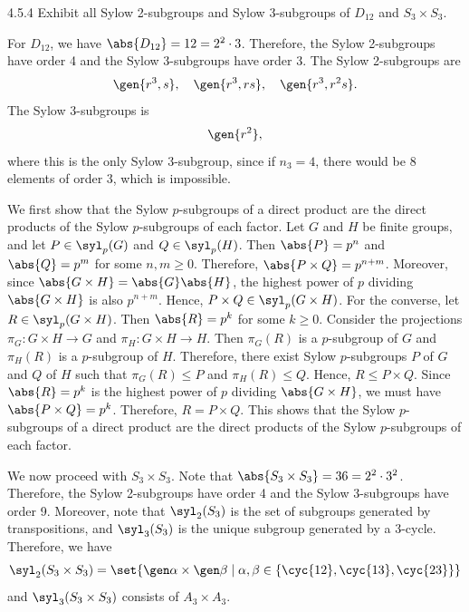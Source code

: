\begin{exercise}{4.5.4}
	Exhibit all Sylow 2-subgroups and Sylow 3-subgroups of $D_{12}$ and $S_3 \times S_3$.
\end{exercise}

\begin{sol}
	For $D_{12}$, we have $\abs{D_{12}} = 12 = 2^2 \cdot 3$.
	Therefore, the Sylow 2-subgroups have order 4 and the Sylow 3-subgroups have order 3.
	The Sylow 2-subgroups are
	\[
		\gen{r^3, s}, \quad \gen{r^3, rs}, \quad \gen{r^3, r^2s}.
	\]
	The Sylow 3-subgroups is
	\[
		\gen{r^2},
	\]
	where this is the only Sylow 3-subgroup, since if $n_3 = 4$, there would be $8$ elements of order $3$, which is impossible.

	We first show that the Sylow $p$-subgroups of a direct product are the direct products of the Sylow $p$-subgroups of each factor.
	Let $G$ and $H$ be finite groups, and let $P \in \syl_p(G)$ and $Q \in \syl_p(H)$.
	Then $\abs{P} = p^n$ and $\abs{Q} = p^m$ for some $n, m \geq 0$.
	Therefore, $\abs{P \times Q} = p^{n + m}$.
	Moreover, since $\abs{G \times H} = \abs{G}\abs{H}$, the highest power of $p$ dividing $\abs{G \times H}$ is also $p^{n + m}$.
	Hence, $P \times Q \in \syl_p(G \times H)$.
	For the converse, let $R \in \syl_p(G \times H)$.
	Then $\abs{R} = p^k$ for some $k \geq 0$.
	Consider the projections $\pi_G \colon G \times H \to G$ and $\pi_H \colon G \times H \to H$.
	Then $\pi_G(R)$ is a $p$-subgroup of $G$ and $\pi_H(R)$ is a $p$-subgroup of $H$.
	Therefore, there exist Sylow $p$-subgroups $P$ of $G$ and $Q$ of $H$ such that $\pi_G(R) \leq P$ and $\pi_H(R) \leq Q$.
	Hence, $R \leq P \times Q$.
	Since $\abs{R} = p^k$ is the highest power of $p$ dividing $\abs{G \times H}$, we must have $\abs{P \times Q} = p^k$.
	Therefore, $R = P \times Q$.
	This shows that the Sylow $p$-subgroups of a direct product are the direct products of the Sylow $p$-subgroups of each factor.

	We now proceed with $S_3 \times S_3$.
	Note that $\abs{S_3 \times S_3} = 36 = 2^2 \cdot 3^2$.
	Therefore, the Sylow 2-subgroups have order 4 and the Sylow 3-subgroups have order 9.
	Moreover, note that $\syl_2(S_3)$ is the set of subgroups generated by transpositions, and $\syl_3(S_3)$ is the unique subgroup generated by a 3-cycle.
	Therefore, we have
	\[
		\syl_2(S_3 \times S_3) = \set{\gen\alpha \times \gen\beta \mid \alpha, \beta \in \{\cyc{1 2}, \cyc{1 3}, \cyc{2 3}}\}
	\]
	and $\syl_3(S_3 \times S_3)$ consists of $A_3 \times A_3$.
\end{sol}

